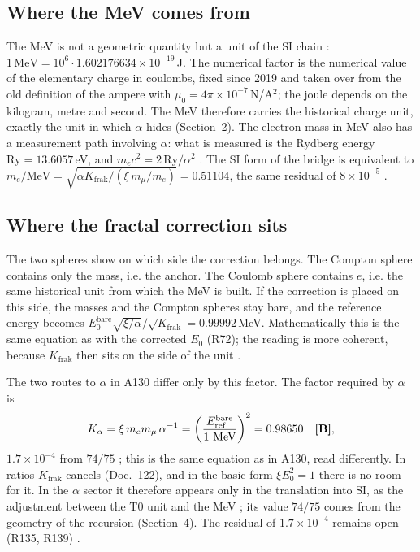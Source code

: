 \subsection{Where the MeV comes from}

The MeV is not a geometric quantity but a unit of the SI chain \QM:
$1\,\text{MeV}=10^6\cdot1.602176634\times10^{-19}$\,J. The numerical factor is the numerical value
of the elementary charge in coulombs, fixed since 2019 and taken over from the old definition of
the ampere with $\mu_0=4\pi\times10^{-7}$\,N/A$^2$; the joule depends on the kilogram, metre and
second. The MeV therefore carries the historical charge unit, exactly the unit in which $\alpha$
hides (Section~2). The electron mass in MeV also has a measurement path involving $\alpha$: what is
measured is the Rydberg energy $\mathrm{Ry}=13.6057$\,eV, and $m_ec^2=2\,\mathrm{Ry}/\alpha^2$ \BM.
The SI form of the bridge is equivalent to
$m_e/\text{MeV}=\sqrt{\alpha K_{\text{frak}}/(\xi\,m_\mu/m_e)}=0.51104$, the same residual of
$8\times10^{-5}$ \KM.

\subsection{Where the fractal correction sits}

The two spheres show on which side the correction belongs. The Compton sphere contains only the
mass, i.e. the anchor. The Coulomb sphere contains $e$, i.e. the same historical unit from which
the MeV is built. If the correction is placed on this side, the masses and the Compton spheres
stay bare, and the reference energy becomes
$E_0^{\text{bare}}\sqrt{\xi/\alpha}/\sqrt{K_{\text{frak}}}=0.99992$\,MeV. Mathematically this is
the same equation as with the corrected $E_0$ (R72); the reading is more coherent, because
$K_{\text{frak}}$ then sits on the side of the unit \SM.

The two routes to $\alpha$ in A130 differ only by this factor. The factor required by $\alpha$ is
\begin{equation}
  K_\alpha=\xi\,m_em_\mu\,\alpha^{-1}=\left(\frac{E_{\text{ref}}^{\text{bare}}}{1\ \text{MeV}}\right)^2
  =0.98650\quad\BM ,
\end{equation}
$1.7\times10^{-4}$ from $74/75$ \KM; this is the same equation as in A130, read differently. In
ratios $K_{\text{frak}}$ cancels (Doc.~122), and in the basic form $\xi E_0^2=1$ there is no room
for it. In the $\alpha$ sector it therefore appears only in the translation into SI, as the
adjustment between the T0 unit and the MeV \KM; its value $74/75$ comes from the geometry of the
recursion (Section~4). The residual of $1.7\times10^{-4}$ remains open (R135, R139) \SM.

